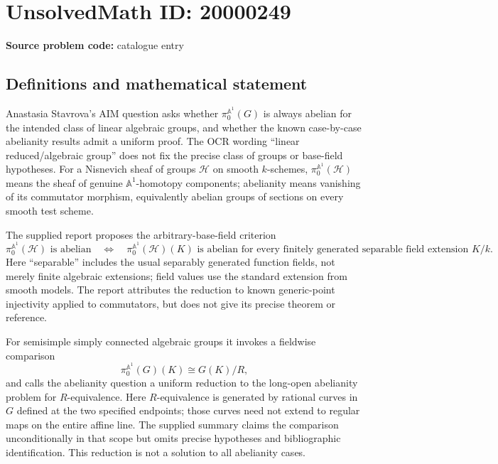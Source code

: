 \documentclass[11pt]{article}
\newcommand{\A}{\mathbb{A}}
\begin{document}
\section*{UnsolvedMath ID: 20000249}
\textbf{Source problem code:} catalogue entry
\subsection{Definitions and mathematical statement}
Anastasia Stavrova's AIM question asks whether \(\pi_0^{\A^1}(G)\) is always abelian for the intended class of linear algebraic groups, and whether the known case-by-case abelianity results admit a uniform proof. The OCR wording ``linear reduced/algebraic group'' does not fix the precise class of groups or base-field hypotheses. For a Nisnevich sheaf of groups \(\mathcal H\) on smooth \(k\)-schemes, \(\pi_0^{\A^1}(\mathcal H)\) means the sheaf of genuine \(\A^1\)-homotopy components; abelianity means vanishing of its commutator morphism, equivalently abelian groups of sections on every smooth test scheme.

The supplied report proposes the arbitrary-base-field criterion
\[
\pi_0^{\A^1}(\mathcal H)\text{ is abelian}
\quad\Longleftrightarrow\quad
\pi_0^{\A^1}(\mathcal H)(K)\text{ is abelian for every finitely generated separable field extension }K/k.
\]
Here ``separable'' includes the usual separably generated function fields, not merely finite algebraic extensions; field values use the standard extension from smooth models. The report attributes the reduction to known generic-point injectivity applied to commutators, but does not give its precise theorem or reference.

For semisimple simply connected algebraic groups it invokes a fieldwise comparison
\[
\pi_0^{\A^1}(G)(K)\cong G(K)/R,
\]
and calls the abelianity question a uniform reduction to the long-open abelianity problem for \(R\)-equivalence. Here \(R\)-equivalence is generated by rational curves in \(G\) defined at the two specified endpoints; those curves need not extend to regular maps on the entire affine line. The supplied summary claims the comparison unconditionally in that scope but omits precise hypotheses and bibliographic identification. This reduction is not a solution to all abelianity cases.
\end{document}
